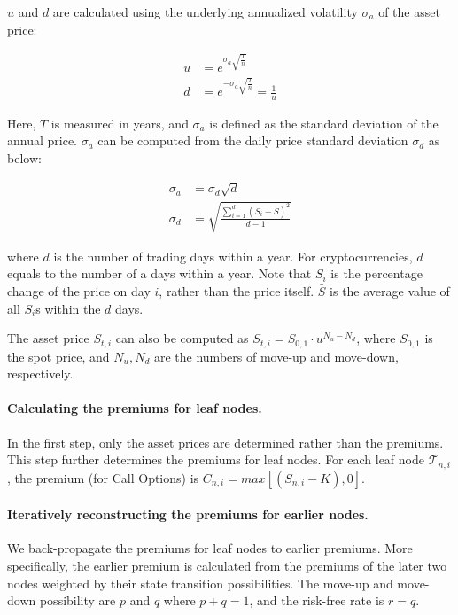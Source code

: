 $u$ and $d$ are calculated using the underlying annualized volatility $\sigma_a$ of the asset price:

\begin{align} 
u &= e^{\sigma_a \sqrt{\frac{T}{n}}}\\
d &= e^{- \sigma_a \sqrt{\frac{T}{n}}} = \frac{1}{u}
\end{align}

Here, $T$ is measured in years, and $\sigma_a$ is defined as the standard deviation of the annual price.
$\sigma_a$ can be computed from the daily price standard deviation $\sigma_d$ as below:

\begin{align} 
\sigma_a &= \sigma_d \sqrt{d}\\
\sigma_d &= \sqrt{\frac{\sum^{d}_{i=1} (S_i - \bar{S})^2}{d-1}}
\end{align}

where $d$ is the number of trading days within a year.
For cryptocurrencies, $d$ equals to the number of a days within a year.
Note that $S_i$ is the percentage change of the price on day $i$, rather than the price itself.
$\bar{S}$ is the average value of all $S_i$s within the $d$ days. 

The asset price $S_{t, i}$ can also be computed as $S_{t, i} = S_{0, 1} \cdot u^{N_u - N_d}$, where $S_{0, 1}$ is the spot price, and $N_u, N_d$ are the numbers of move-up and move-down, respectively.

\paragraph{Calculating the premiums for leaf nodes.}
In the first step, only the asset prices are determined rather than the premiums.
This step further determines the premiums for leaf nodes.
For each leaf node $\mathcal{T}_{n, i}$, the premium (for Call Options) is $C_{n, i} = max[(S_{n, i} - K), 0]$.

\paragraph{Iteratively reconstructing the premiums for earlier nodes.}
We back-propagate the premiums for leaf nodes to earlier premiums.
More specifically, the earlier premium is calculated from the premiums of the later two nodes weighted by their state transition possibilities.
The move-up and move-down possibility are $p$ and $q$ where $p + q = 1$, and the risk-free rate is $r = q$.

